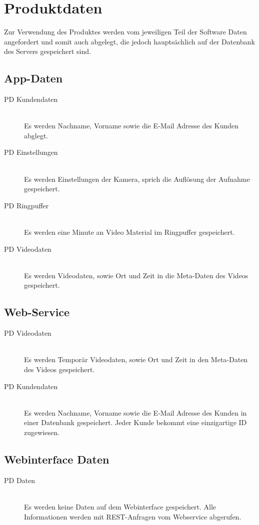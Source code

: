 \chapter{Produktdaten}
Zur Verwendung des Produktes werden vom jeweiligen Teil der Software Daten angefordert und somit auch abgelegt, die jedoch haupts\"achlich auf der Datenbank des Servers gespeichert sind.
\section{App-Daten}
\begin{description}
\item[PD Kundendaten]\hfill \\
Es werden Nachname, Vorname sowie die E-Mail Adresse des Kunden abglegt.
\item[PD Einstellungen]\hfill \\
Es werden Einstellungen der Kamera, sprich die Auflösung der Aufnahme gespeichert.
\item[PD Ringpuffer]\hfill \\
Es werden eine Minute an Video Material im Ringpuffer gespeichert.
\item[PD Videodaten]\hfill \\
Es werden Videodaten, sowie Ort und Zeit in die Meta-Daten des Videos gespeichert.
\end{description}

\section{Web-Service}
\begin{description}
\item[PD Videodaten]\hfill \\
Es werden Temporär Videodaten, sowie Ort und Zeit in den Meta-Daten des Videos gespeichert.
\item[PD Kundendaten]\hfill \\
Es werden Nachname, Vorname sowie die E-Mail Adresse des Kunden in einer Datenbank gespeichert. Jeder Kunde bekommt eine einzigartige ID zugewiesen. 
\end{description}

\section{Webinterface Daten}
\begin{description}
\item[PD Daten]\hfill \\
Es werden keine Daten auf dem Webinterface gespeichert. Alle Informationen werden mit REST-Anfragen vom Webservice abgerufen.
\end{description}


